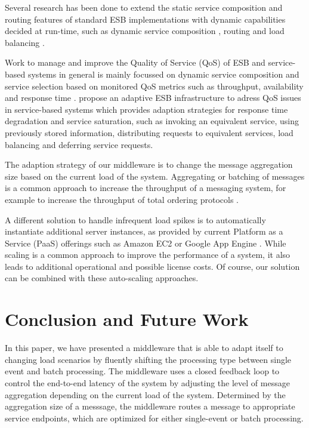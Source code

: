 Several research has been done to extend the static service composition and routing features of standard ESB implementations with dynamic capabilities decided at run-time, such as dynamic service composition \citep{Chang:2007aa}, routing \citep{Bai:2007aa} \citep{Wu:2008aa} \citep{Ziyaeva:2008aa} and load balancing \citep{Jongtaveesataporn:2010aa}.

Work to manage and improve the Quality of Service (QoS) of ESB and service-based systems in general is mainly focussed on dynamic service composition and service selection based on monitored QoS metrics such as throughput, availability and response time \citep{Calinescu:2011aa}. \cite{Gonzalez:2011} propose an adaptive ESB infrastructure to adress QoS issues in service-based systems which provides adaption strategies for response time degradation and service saturation, such as invoking an equivalent service, using previously stored information, distributing requests to equivalent services, load balancing and deferring service requests.

The adaption strategy of our middleware is to change the message aggregation size based on the current load of the system. Aggregating or batching of messages is a common approach to increase the throughput of a messaging system, for example to increase the throughput of total ordering protocols \citep{Friedman:1997aa} \citep{Friedman:2006aa} \citep{Romano:2012aa} \citep{Didona:2012aa}.

A different solution to handle infrequent load spikes is to automatically instantiate additional server instances, as provided by current Platform as a Service (PaaS) offerings such as Amazon EC2 \citep{ec2_autoscaling} or Google App Engine \citep{google_cloud_autoscaling}. While scaling is a common approach to improve the performance of a system, it also leads to additional operational and possible license costs. Of course, our solution can be combined with these auto-scaling approaches.

\section{Conclusion and Future Work}\label{sec:conclusion}
In this paper, we have presented a middleware that is able to adapt itself to changing load scenarios by fluently shifting the processing type between single event and batch processing. The middleware uses a closed feedback loop to control the end-to-end latency of the system by adjusting the level of message aggregation depending on the current load of the system. Determined by the aggregation size of a messsage, the middleware routes a message to appropriate service endpoints, which are optimized for either single-event or batch processing.

